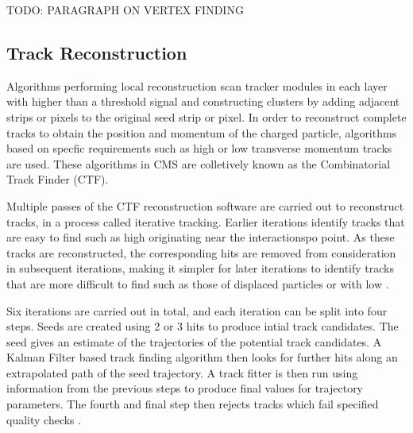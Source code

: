 TODO: PARAGRAPH ON VERTEX FINDING



\subsection{Track Reconstruction}
\label{ss:track_reconstruction}
Algorithms performing local reconstruction scan tracker modules in each layer with higher than a threshold
signal and constructing clusters by adding adjacent strips or pixels to the original seed strip or pixel. In
order to reconstruct complete tracks to obtain the position and momentum of the charged particle, algorithms
based on specfic requirements such as high or low transverse momentum tracks are used. These algorithms in CMS
are colletively known as the Combinatorial Track Finder (CTF).

Multiple passes of the CTF reconstruction software are carried out to reconstruct tracks, in a process called
iterative tracking. Earlier iterations identify tracks that are easy to find such as high \pt originating
near the interactionspo point. As these tracks are reconstructed, the corresponding hits are removed from
consideration in subsequent iterations, making it simpler for later iterations to identify tracks that are
more difficult to find such as those of displaced particles or with low \pt.

Six iterations are carried out in total, and each iteration can be split into four steps. Seeds are created
using 2 or 3 hits to produce intial track candidates. The seed gives an estimate of the trajectories of the
potential track candidates. A Kalman Filter \cite{kalman_filter, Speer:927395} based track finding algorithm
then looks for further hits along an extrapolated path of the seed trajectory. A track fitter is then run
using information from the previous steps to produce final values for trajectory parameters. The fourth and
final step then rejects tracks which fail specified quality checks \cite{track_reconstruction}.

